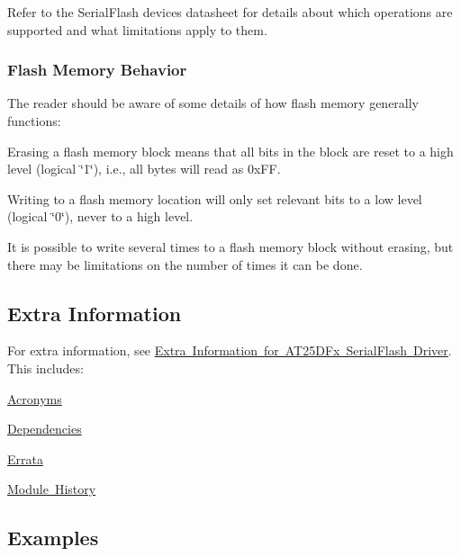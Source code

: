 Refer to the Serial\+Flash device\textquotesingle{}s datasheet for details about which operations are supported and what limitations apply to them.\hypertarget{group__asfdoc__common2__at25dfx__group_asfdoc_common2_at25dfx_special_flash}{}\subsubsection{Flash Memory Behavior}\label{group__asfdoc__common2__at25dfx__group_asfdoc_common2_at25dfx_special_flash}
The reader should be aware of some details of how flash memory generally functions\+:
\begin{DoxyEnumerate}
\item Erasing a flash memory block means that all bits in the block are reset to a high level (logical \char`\"{}1\char`\"{}), i.\+e., all bytes will read as {\ttfamily 0x\+FF}.
\item Writing to a flash memory location will only set relevant bits to a low level (logical \char`\"{}0\char`\"{}), never to a high level.
\item It is possible to write several times to a flash memory block without erasing, but there may be limitations on the number of times it can be done.
\end{DoxyEnumerate}\hypertarget{group__asfdoc__common2__at25dfx__group_asfdoc_common2_at25dfx_extra_info}{}\subsection{Extra Information}\label{group__asfdoc__common2__at25dfx__group_asfdoc_common2_at25dfx_extra_info}
For extra information, see \mbox{\hyperlink{asfdoc_common2_at25dfx_extra}{Extra Information for A\+T25\+D\+Fx Serial\+Flash Driver}}. This includes\+:
\begin{DoxyItemize}
\item \mbox{\hyperlink{asfdoc_common2_at25dfx_extra_asfdoc_common2_at25dfx_extra_acronyms}{Acronyms}}
\item \mbox{\hyperlink{asfdoc_common2_at25dfx_extra_asfdoc_common2_at25dfx_extra_dependencies}{Dependencies}}
\item \mbox{\hyperlink{asfdoc_common2_at25dfx_extra_asfdoc_common2_at25dfx_extra_errata}{Errata}}
\item \mbox{\hyperlink{asfdoc_common2_at25dfx_extra_asfdoc_common2_at25dfx_extra_history}{Module History}}
\end{DoxyItemize}\hypertarget{group__asfdoc__common2__at25dfx__group_asfdoc_common2_at25dfx_examples}{}\subsection{Examples}\label{group__asfdoc__common2__at25dfx__group_asfdoc_common2_at25dfx_examples}
